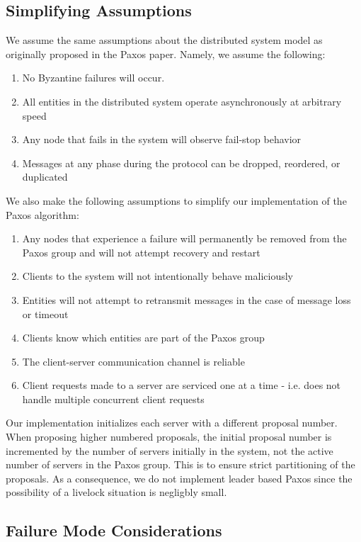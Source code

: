 \documentclass{article}
\begin{document}
\subsection{Simplifying Assumptions}

We assume the same assumptions about the distributed system model as originally proposed in the Paxos paper. Namely, we assume the following:

\begin{enumerate}
\item No Byzantine failures will occur.
\item All entities in the distributed system operate asynchronously at arbitrary speed
\item Any node that fails in the system will observe fail-stop behavior
\item Messages at any phase during the protocol can be dropped, reordered, or duplicated
\end{enumerate}

We also make the following assumptions to simplify our implementation of the Paxos algorithm:

\begin{enumerate}
\item Any nodes that experience a failure will permanently be removed from the Paxos group and will not attempt recovery and restart
\item Clients to the system will not intentionally behave maliciously
\item Entities will not attempt to retransmit messages in the case of message loss or timeout
\item Clients know which entities are part of the Paxos group
\item The client-server communication channel is reliable
\item Client requests made to a server are serviced one at a time - i.e. does not handle multiple concurrent client requests
\end{enumerate}

Our implementation initializes each server with a different proposal number. 
When proposing higher numbered proposals, the initial proposal number is incremented by the number of servers initially in the system, not the active number of servers in the Paxos group.
This is to ensure strict partitioning of the proposals.
As a consequence, we do not implement leader based Paxos since the possibility of a livelock situation is negligbly small.

\subsection{Failure Mode Considerations}
\end{document}
